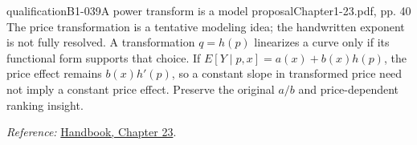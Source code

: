 {\begin{reviewnote}{qualification}{B1-039}{A power transform is a model proposal}{Chapter1-23.pdf, pp. 40}
The price transformation is a tentative modeling idea; the handwritten exponent is not fully resolved. A transformation $q=h(p)$ linearizes a curve only if its functional form supports that choice. If $E[Y\mid p,x]=a(x)+b(x)h(p)$, the price effect remains $b(x)h'(p)$, so a constant slope in transformed price need not imply a constant price effect. Preserve the original $a/b$ and price-dependent ranking insight.
\par\smallskip\textit{Reference:} \href{https://matheusfacure.github.io/python-causality-handbook/23-Challenges-with-Effect-Heterogeneity-and-Nonlinearity.html}{Handbook, Chapter 23}.
\end{reviewnote}

}
